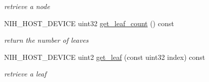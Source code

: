 \begin{DoxyCompactItemize}
\begin{DoxyCompactList}\small\item\em retrieve a node \end{DoxyCompactList}\item 
\hypertarget{structnih_1_1_octree_3_01breadth__first__tree_00_01_domain__type_01_4_a93cdaad384785be390ef40b813b8eee7}{
\-N\-I\-H\-\_\-\-H\-O\-S\-T\-\_\-\-D\-E\-V\-I\-C\-E uint32 \hyperlink{structnih_1_1_octree_3_01breadth__first__tree_00_01_domain__type_01_4_a93cdaad384785be390ef40b813b8eee7}{get\-\_\-leaf\-\_\-count} () const }
\label{structnih_1_1_octree_3_01breadth__first__tree_00_01_domain__type_01_4_a93cdaad384785be390ef40b813b8eee7}

\begin{DoxyCompactList}\small\item\em return the number of leaves \end{DoxyCompactList}\item 
\hypertarget{structnih_1_1_octree_3_01breadth__first__tree_00_01_domain__type_01_4_a4d927782358d1cbfa1b424f135dda56a}{
\-N\-I\-H\-\_\-\-H\-O\-S\-T\-\_\-\-D\-E\-V\-I\-C\-E uint2 \hyperlink{structnih_1_1_octree_3_01breadth__first__tree_00_01_domain__type_01_4_a4d927782358d1cbfa1b424f135dda56a}{get\-\_\-leaf} (const uint32 index) const }
\label{structnih_1_1_octree_3_01breadth__first__tree_00_01_domain__type_01_4_a4d927782358d1cbfa1b424f135dda56a}

\begin{DoxyCompactList}\small\item\em retrieve a leaf \end{DoxyCompactList}\end{DoxyCompactItemize}

